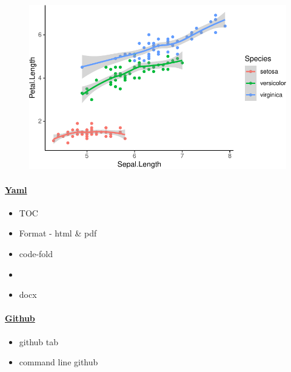 \documentclass[
  letterpaper,
  DIV=11,
  numbers=noendperiod]{scrartcl}
\let\oldparagraph\paragraph
\renewcommand{\paragraph}[1]{\oldparagraph{#1}\mbox{}}
\begin{document}
\begin{figure}[H]

{\centering \includegraphics{quarto_basics_files/figure-pdf/unnamed-chunk-1-1.pdf}

}

\end{figure}

\hypertarget{yaml}{%
\paragraph{\texorpdfstring{\ul{Yaml}}{Yaml}}\label{yaml}}

\begin{itemize}
\item
  TOC
\item
  Format - html \& pdf
\item
  code-fold
\item
\item
  docx
\end{itemize}

\hypertarget{github}{%
\paragraph{\texorpdfstring{\ul{Github}}{Github}}\label{github}}

\begin{itemize}
\item
  github tab
\item
  command line github
\end{itemize}
\end{document}
